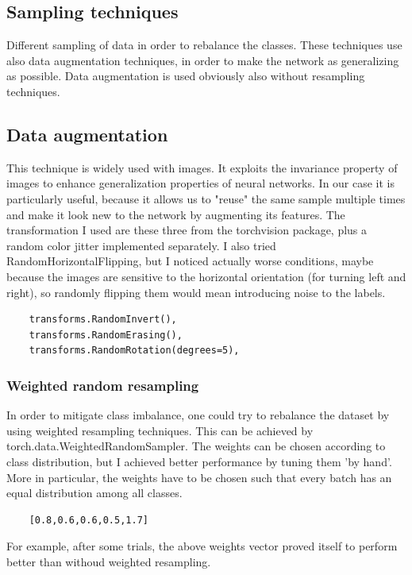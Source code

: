 \documentclass[12pt,a4paper,oneside]{article}
\begin{document}
\subsection{Sampling techniques}

Different sampling of data in order to rebalance the classes. These techniques
use also data augmentation techniques, in order to make the network as
generalizing as possible. Data augmentation is used obviously also without
resampling techniques.

\subsection{Data augmentation}

This technique is widely used with images. It exploits the invariance property
of images to enhance generalization properties of neural networks. In our case
it is particularly useful, because it allows us to "reuse" the same sample
multiple times and make it look new to the network by augmenting its features.
The transformation I used are these three from the torchvision package, plus a
random color jitter implemented separately. I also tried
RandomHorizontalFlipping, but I noticed actually worse conditions, maybe because
the images are sensitive to the horizontal orientation (for turning left and
right), so randomly flipping them would mean introducing noise to the labels.

\begin{verbatim}
    transforms.RandomInvert(),
    transforms.RandomErasing(),
    transforms.RandomRotation(degrees=5),
\end{verbatim}

\subsubsection{Weighted random resampling}

In order to mitigate class imbalance, one could try to rebalance the dataset by
using weighted resampling techniques. This can be achieved by
torch.data.WeightedRandomSampler. The weights can be chosen according to class
distribution, but I achieved better performance by tuning them 'by hand'. More
in particular, the weights have to be chosen such that every batch has an equal
distribution among all classes. 
\begin{verbatim}
    [0.8,0.6,0.6,0.5,1.7]
\end{verbatim}
For example, after some trials, the above weights vector proved itself to
perform better than withoud weighted resampling. 
\end{document}
